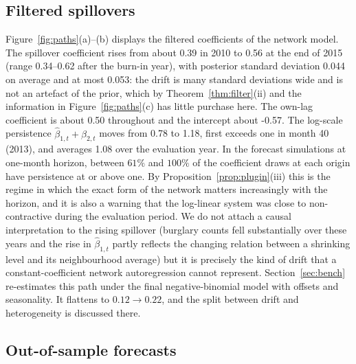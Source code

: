 \documentclass[12pt]{article}
\theoremstyle{plain}
\theoremstyle{definition}
\theoremstyle{remark}
\newcommand{\BetaOneFirst}{0.39}
\newcommand{\BetaOneLast}{0.56}
\newcommand{\BetaOneMin}{0.34}
\newcommand{\BetaOneMax}{0.62}
\newcommand{\BetaTwoMean}{0.50}
\newcommand{\BetaZeroMean}{-0.57}
\newcommand{\SdBetaOneMean}{0.044}
\newcommand{\SdBetaOneMax}{0.053}
\newcommand{\RhoMin}{0.78}
\newcommand{\RhoMax}{1.18}
\newcommand{\RhoFirstAboveOne}{40}
\newcommand{\RhoLastMean}{1.08}
\newcommand{\FinalBOneFirst}{0.12}
\newcommand{\FinalBOneLast}{0.22}
\begin{document}
\subsection{Filtered spillovers}
Figure~\ref{fig:paths}(a)--(b) displays the filtered coefficients of the network model. The spillover coefficient rises from about \BetaOneFirst{} in 2010 to \BetaOneLast{} at the end of 2015 (range \BetaOneMin--\BetaOneMax{} after the burn-in year), with posterior standard deviation \SdBetaOneMean{} on average and at most \SdBetaOneMax: the drift is many standard deviations wide and is not an artefact of the prior, which by Theorem~\ref{thm:filter}(ii) and the information in Figure~\ref{fig:paths}(c) has little purchase here. The own-lag coefficient is about \BetaTwoMean{} throughout and the intercept about \BetaZeroMean. The log-scale persistence $\hat\beta_{1,t}+\hat\beta_{2,t}$ moves from \RhoMin{} to \RhoMax{}, first exceeds one in month \RhoFirstAboveOne{} (2013), and averages \RhoLastMean{} over the evaluation year. In the forecast simulations at one-month horizon, between $61\%$ and $100\%$ of the coefficient draws at each origin have persistence at or above one. By Proposition~\ref{prop:plugin}(iii) this is the regime in which the exact form of the network matters increasingly with the horizon, and it is also a warning that the log-linear system was close to non-contractive during the evaluation period. We do not attach a causal interpretation to the rising spillover (burglary counts fell substantially over these years and the rise in $\hat\beta_{1,t}$ partly reflects the changing relation between a shrinking level and its neighbourhood average) but it is precisely the kind of drift that a constant-coefficient network autoregression cannot represent. Section~\ref{sec:bench} re-estimates this path under the final negative-binomial model with offsets and seasonality. It flattens to $\FinalBOneFirst\to\FinalBOneLast$, and the split between drift and heterogeneity is discussed there.

\subsection{Out-of-sample forecasts}\label{sec:forecast}
\end{document}
